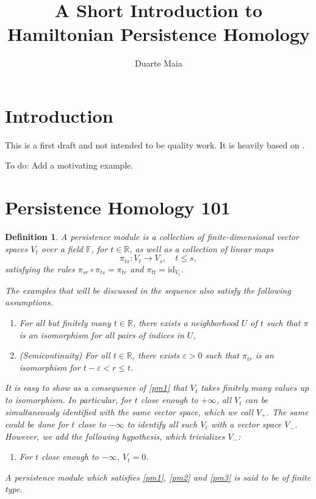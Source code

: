 \documentclass{article}
\title{A Short Introduction to Hamiltonian Persistence Homology}
\author{Duarte Maia}
\newtheorem{definition}{Definition}
\theoremstyle{nonumberplain}
\newcommand{\R}{\mathbb{R}}
\newcommand{\FF}{\mathbb{F}}
\newcommand{\id}{\mathrm{id}}
\begin{document}
\maketitle

\section{Introduction}

This is a first draft and not intended to be quality work. It is heavily based on \cite{polterovich}.

To do: Add a motivating example.

\section{Persistence Homology 101}

\begin{definition}
A \emph{persistence module} is a collection of finite-dimensional vector spaces $V_t$ over a field $\FF$, for $t \in \R$, as well as a collection of linear maps
\[\pi_{ts} \colon V_t \to V_s, \quad t\leq s,\]
satisfying the rules $\pi_{sr} \circ \pi_{ts} = \pi_{tr}$ and $\pi_{tt} = \id_{V_t}$.

The examples that will be discussed in the sequence also satisfy the following assumptions.

\begin{enumerate}[label=\roman*)]
\item\label{pm1} For all but finitely many $t \in \R$, there exists a neighborhood $U$ of $t$ such that $\pi$ is an isomorphism for all pairs of indices in $U$,
\item\label{pm2} \textit{(Semicontinuity)} For all $t \in \R$, there exists $\varepsilon > 0$ such that $\pi_{tr}$ is an isomorphism for $t-\varepsilon < r \leq t$.
\end{enumerate}

It is easy to show as a consequence of \ref{pm1} that $V_t$ takes finitely many values up to isomorphism. In particular, for $t$ close enough to $+\infty$, all $V_t$ can be simultaneously identified with the same vector space, which we call $V_+$. The same could be done for $t$ close to $-\infty$ to identify all such $V_t$ with a vector space $V_-$. However, we add the following hypothesis, which trivializes $V_-$:

\begin{enumerate}[resume*]
\item\label{pm3} For $t$ close enough to $-\infty$, $V_t = 0$.
\end{enumerate}

A persistence module which satisfies \ref{pm1}, \ref{pm2} and \ref{pm3} is said to be \emph{of finite type}.
\end{definition}
\end{document}

